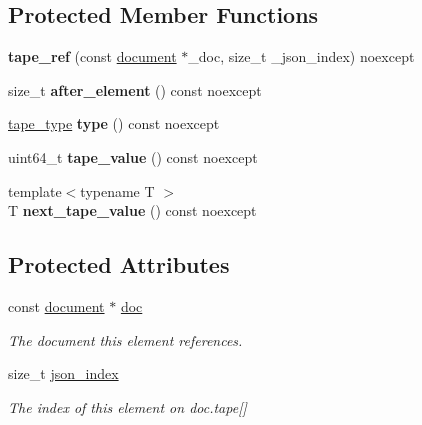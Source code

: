 \subsection*{Protected Member Functions}
\begin{DoxyCompactItemize}
\item 
\mbox{\label{classsimdjson_1_1document_1_1tape__ref_a5fed38c847b4c6c5e293bc42ded4e274}} 
{\bfseries tape\+\_\+ref} (const \hyperlink{classsimdjson_1_1document}{document} $\ast$\+\_\+doc, size\+\_\+t \+\_\+json\+\_\+index) noexcept
\item 
\mbox{\label{classsimdjson_1_1document_1_1tape__ref_aec73115785f03f951d8d8791302875ac}} 
size\+\_\+t {\bfseries after\+\_\+element} () const noexcept
\item 
\mbox{\label{classsimdjson_1_1document_1_1tape__ref_a79f677a9a88827ffb44d630952c43f5e}} 
\hyperlink{classsimdjson_1_1document_aebad9f5f3b86bf3f87e37031335626a0}{tape\+\_\+type} {\bfseries type} () const noexcept
\item 
\mbox{\label{classsimdjson_1_1document_1_1tape__ref_a4227d872e2c7aa506ec84ff0bdac8118}} 
uint64\+\_\+t {\bfseries tape\+\_\+value} () const noexcept
\item 
\mbox{\label{classsimdjson_1_1document_1_1tape__ref_a01e27e39aaba6ed5a944a8c43011a271}} 
{\footnotesize template$<$typename T $>$ }\\T {\bfseries next\+\_\+tape\+\_\+value} () const noexcept
\end{DoxyCompactItemize}
\subsection*{Protected Attributes}
\begin{DoxyCompactItemize}
\item 
const \hyperlink{classsimdjson_1_1document}{document} $\ast$ \hyperlink{classsimdjson_1_1document_1_1tape__ref_ab67f16e95e949825ef2e6badbf33e806}{doc}
\begin{DoxyCompactList}\small\item\em The document this element references. \end{DoxyCompactList}\item 
\mbox{\label{classsimdjson_1_1document_1_1tape__ref_a8dc0ecd1d79cf0b8807221145d05e388}} 
size\+\_\+t \hyperlink{classsimdjson_1_1document_1_1tape__ref_a8dc0ecd1d79cf0b8807221145d05e388}{json\+\_\+index}
\begin{DoxyCompactList}\small\item\em The index of this element on {\ttfamily doc.\+tape\mbox{[}\mbox{]}} \end{DoxyCompactList}\end{DoxyCompactItemize}
